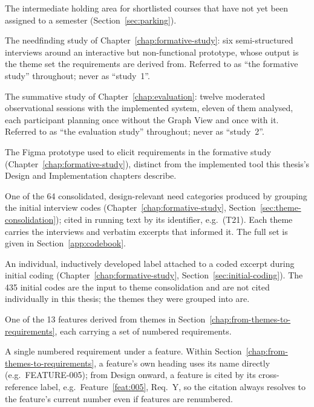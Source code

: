 \begin{description}
  \label{gls:parking-stage}
  \item[Parking Stage] The intermediate holding area for shortlisted courses that have not yet been assigned to a semester (Section~\ref{sec:parking}).
  \label{gls:formative-study}
  \item[Formative study] The needfinding study of Chapter~\ref{chap:formative-study}: six semi-structured interviews around an interactive but non-functional prototype, whose output is the theme set the requirements are derived from. Referred to as \enquote{the formative study} throughout; never as \enquote{study~1}.
  \label{gls:evaluation-study}
  \item[Evaluation study] The summative study of Chapter~\ref{chap:evaluation}: twelve moderated observational sessions with the implemented system, eleven of them analysed, each participant planning once without the Graph View and once with it. Referred to as \enquote{the evaluation study} throughout; never as \enquote{study~2}.
  \label{gls:prototype}
  \item[Prototype] The Figma prototype used to elicit requirements in the formative study (Chapter~\ref{chap:formative-study}), distinct from the implemented tool this thesis's Design and Implementation chapters describe.
  \label{gls:theme}
  \item[Theme (T-identifier)] One of the 64 consolidated, design-relevant need categories produced by grouping the initial interview codes (Chapter~\ref{chap:formative-study}, Section~\ref{sec:theme-consolidation}); cited in running text by its identifier, e.g.\ (T21). Each theme carries the interviews and verbatim excerpts that informed it. The full set is given in Section~\ref{app:codebook}.
  \label{gls:code}
  \item[Code] An individual, inductively developed label attached to a coded excerpt during initial coding (Chapter~\ref{chap:formative-study}, Section~\ref{sec:initial-coding}). The 435 initial codes are the input to theme consolidation and are not cited individually in this thesis; the themes they were grouped into are.
  \label{gls:feature}
  \item[Feature (FEATURE-XXX)] One of the 13 features derived from themes in Section~\ref{chap:from-themes-to-requirements}, each carrying a set of numbered requirements.
  \label{gls:requirement}
  \item[Requirement (Req.)] A single numbered requirement under a feature. Within Section~\ref{chap:from-themes-to-requirements}, a feature's own heading uses its name directly (e.g.\ FEATURE-005); from Design onward, a feature is cited by its cross-reference label, e.g.\ Feature~\ref{feat:005}, Req.~Y, so the citation always resolves to the feature's current number even if features are renumbered.

\end{description}
